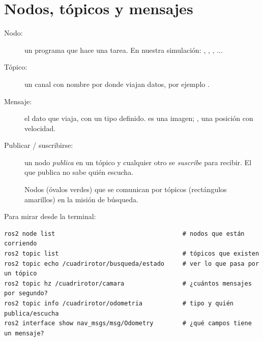 \section{Nodos, tópicos y mensajes}

\begin{description}
  \item[Nodo:] un programa que hace una tarea. En nuestra simulación: ,
        , , ...
  \item[Tópico:] un canal con nombre por donde viajan datos, por ejemplo .
  \item[Mensaje:] el dato que viaja, con un tipo definido.  es una imagen;
        , una posición con velocidad.
  \item[Publicar / suscribirse:] un nodo \emph{publica} en un tópico y cualquier otro se
        \emph{suscribe} para recibir. El que publica no sabe quién escucha.
\end{description}

\begin{figure}[H]
\centering
{}
\caption{Nodos (óvalos verdes) que se comunican por tópicos (rectángulos amarillos) en la misión de
búsqueda.}
\end{figure}

Para mirar desde la terminal:
\begin{lstlisting}[style=bash]
ros2 node list                                   # nodos que están corriendo
ros2 topic list                                  # tópicos que existen
ros2 topic echo /cuadrirotor/busqueda/estado     # ver lo que pasa por un tópico
ros2 topic hz /cuadrirotor/camara                # ¿cuántos mensajes por segundo?
ros2 topic info /cuadrirotor/odometria           # tipo y quién publica/escucha
ros2 interface show nav_msgs/msg/Odometry        # ¿qué campos tiene un mensaje?
\end{lstlisting}

